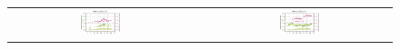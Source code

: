 \begin{figure}
	\centering
\def \subplotwidth {0.24\textwidth}
\begin{tabular}{cc|c}
\includegraphics[width=\subplotwidth]{./figures/csp_spoc_incommon/bubble_csp_spoc_incommon_VPpcac_d2_nolegend}& & \includegraphics[width=\subplotwidth]{./figures/csp_spoc_incommon/bubble_csp_spoc_incommon_VPpcac_d4_nolegend}\\

\end{tabular}
\end{figure}
